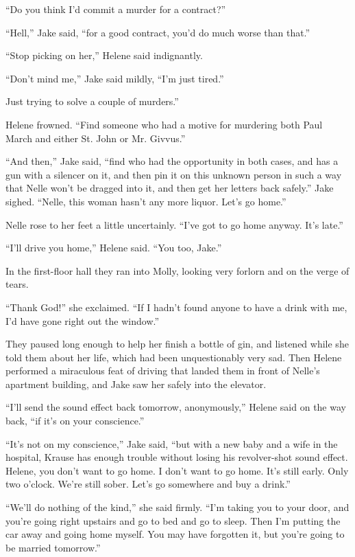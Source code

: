 \documentclass{novel}
\begin{document}
“Do you think I’d commit a murder for a contract?”

“Hell,” Jake said, “for a good contract, you’d do much worse than that.”

“Stop picking on her,” Helene said indignantly.

“Don’t mind me,” Jake said mildly, “I’m just tired.”

Just trying to solve a couple of murders.”

Helene frowned. “Find someone who had a motive for murdering both Paul March and either St. John or Mr. Givvus.”

“And then,” Jake said, “find who had the opportunity in both cases, and has a gun with a silencer on it, and then pin it on this unknown person in such a way that Nelle won’t be dragged into it, and then get her letters back safely.” Jake sighed. “Nelle, this woman hasn’t any more liquor. Let’s go home.”

Nelle rose to her feet a little uncertainly. “I’ve got to go home anyway. It’s late.”

“I'll drive you home,” Helene said. “You too, Jake.”

In the first-floor hall they ran into Molly, looking very forlorn and on the verge of tears.

“Thank God!” she exclaimed. “If I hadn’t found anyone to have a drink with me, I’d have gone right out the window.”

They paused long enough to help her finish a bottle of gin, and listened while she told them about her life, which had been unquestionably very sad. Then Helene performed a miraculous feat of driving that landed them in front of Nelle’s apartment building, and Jake saw her safely into the elevator.

“I’ll send the sound effect back tomorrow, anonymously,” Helene said on the way back, “if it’s on your conscience.”

“It’s not on my conscience,” Jake said, “but with a new baby and a wife in the hospital, Krause has enough trouble without losing his revolver-shot sound effect. Helene, you don’t want to go home. I don’t want to go home. It’s still early. Only two o’clock. We’re still sober. Let’s go somewhere and buy a drink.”

“We’ll do nothing of the kind,” she said firmly. “I'm taking you to your door, and you’re going right upstairs and go to bed and go to sleep. Then I’m putting the car away and going home myself. You may have forgotten it, but you’re going to be married tomorrow.”
\end{document}
